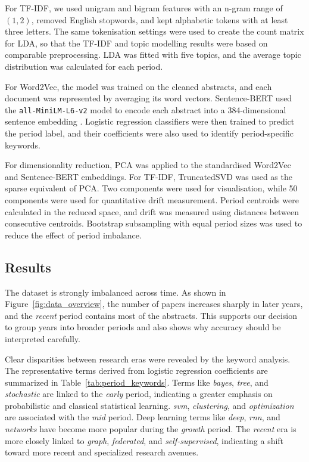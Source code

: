 \documentclass[11pt]{article}
\begin{document}
For TF-IDF, we used unigram and bigram features with an n-gram range of $(1,2)$, removed English stopwords, and kept alphabetic tokens with at least three letters. The same tokenisation settings were used to create the count matrix for LDA, so that the TF-IDF and topic modelling results were based on comparable preprocessing. LDA was fitted with five topics, and the average topic distribution was calculated for each period.

For Word2Vec, the model was trained on the cleaned abstracts, and each document was represented by averaging its word vectors. Sentence-BERT used the \texttt{all-MiniLM-L6-v2} model to encode each abstract into a 384-dimensional sentence embedding \cite{reimers2019}. Logistic regression classifiers were then trained to predict the period label, and their coefficients were also used to identify period-specific keywords.

For dimensionality reduction, PCA was applied to the standardised Word2Vec and Sentence-BERT embeddings. For TF-IDF, TruncatedSVD was used as the sparse equivalent of PCA. Two components were used for visualisation, while 50 components were used for quantitative drift measurement. Period centroids were calculated in the reduced space, and drift was measured using distances between consecutive centroids. Bootstrap subsampling with equal period sizes was used to reduce the effect of period imbalance.

\subsection{Results}

The dataset is strongly imbalanced across time. As shown in Figure~\ref{fig:data_overview}, the number of papers increases sharply in later years, and the \textit{recent} period contains most of the abstracts. This supports our decision to group years into broader periods and also shows why accuracy should be interpreted carefully.

Clear disparities between research eras were revealed by the keyword analysis. The representative terms derived from logistic regression coefficients are summarized in Table~\ref{tab:period_keywords}. Terms like \textit{bayes}, \textit{tree}, and \textit{stochastic} are linked to the \textit{early} period, indicating a greater emphasis on probabilistic and classical statistical learning. \textit{svm}, \textit{clustering}, and \textit{optimization} are associated with the \textit{mid} period. Deep learning terms like \textit{deep}, \textit{rnn}, and \textit{networks} have become more popular during the \textit{growth} period. The \textit{recent} era is more closely linked to \textit{graph}, \textit{federated}, and \textit{self-supervised}, indicating a shift toward more recent and specialized research avenues.
\end{document}
